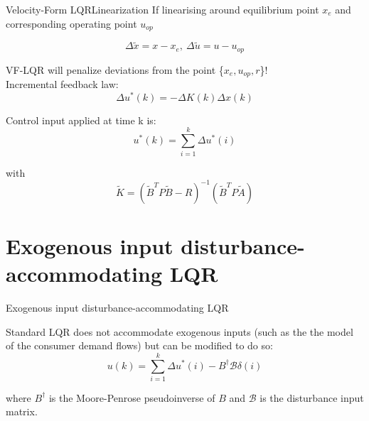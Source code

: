 \documentclass[10pt]{beamer}
\begin{document}
\begin{frame}{Velocity-Form LQR}{Linearization}
	If linearising around equilibrium point $x_e$ and corresponding operating point $u_{op}$
		
	\begin{equation}\label{eq:DeltaInterpretation}
		\Delta \tilde{x} = x-x_e, \ \Delta \tilde{u} = u-u_{op}
	\end{equation}

	VF-LQR will penalize deviations from the point \{$x_e, u_{op}, r$\}!\\
	\medskip	
	Incremental feedback law:
	\begin{equation}\label{eq:ControlIncrementLaw}
		\Delta u^*(k) = -\Delta K(k) \Delta x(k) 
	\end{equation}
	
	Control input applied at time k is:
	\begin{equation}\label{eq:ActualControlApplied}
		u^*(k) = \sum_{i=1}^{k} \Delta u^*(i)
	\end{equation}

	with
	\begin{equation}
		\tilde{K} = (\tilde{B}^TP\tilde{B}-R)^{-1}(\tilde{B}^TP\tilde{A})
	\end{equation}
\end{frame}


\section{Exogenous input disturbance-accommodating LQR}
\begin{frame}{Exogenous input disturbance-accommodating LQR}

	Standard LQR does not accommodate exogenous inputs (such as the the model of the consumer demand flows) but can be modified to do so:
	\begin{equation}
		u(k) = \sum_{i=1}^{k} \Delta{u}^*(i) - B^\dagger \mathcal{B}\delta(i)
	\end{equation}
	
	where $B^\dagger$ is the Moore-Penrose pseudoinverse of $B$ and $\mathcal{B}$ is the disturbance input matrix.
\end{frame}

	
\end{document}
